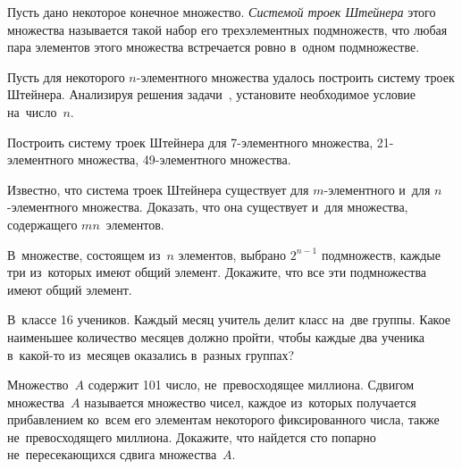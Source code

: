 Пусть дано некоторое конечное множество.
\emph{Системой троек Штейнера} этого множества называется такой набор его
трехэлементных подмножеств, что любая пара элементов этого множества
встречается ровно в~одном подмножестве.

\begin{problems}

\item
Пусть для некоторого $n$-элементного множества удалось построить
систему троек Штейнера.
Анализируя решения
задачи~,
установите необходимое условие на~число~$n$.

\item
Построить систему троек Штейнера для
7-эле\-мен\-тного множества,
21-эле\-мен\-тного множества,
49-эле\-мен\-тного множества.

\item
Известно, что система троек Штейнера существует для $m$-элементного и~для
$n$-элементного множества.
Доказать, что она существует и~для множества, содержащего $mn$~элементов.

\item
В~множестве, состоящем из~$n$ элементов, выбрано $2^{n-1}$ подмножеств,
каждые три из~которых имеют общий элемент.
Докажите, что все эти подмножества имеют общий элемент.

\item
В~классе 16 учеников.
Каждый месяц учитель делит класс на~две группы.
Какое наименьшее количество месяцев должно пройти, чтобы каждые два ученика
в~какой-то из~месяцев оказались в~разных группах?

\item
Множество~$A$ содержит 101 число, не~превосходящее миллиона.
Сдвигом множества~$A$ называется множество чисел, каждое из~которых получается
прибавлением ко~всем его элементам некоторого фиксированного числа, также
не~превосходящего миллиона.
Докажите, что найдется сто попарно не~пересекающихся сдвига множества~$A$.

\end{problems}

\endgroup

